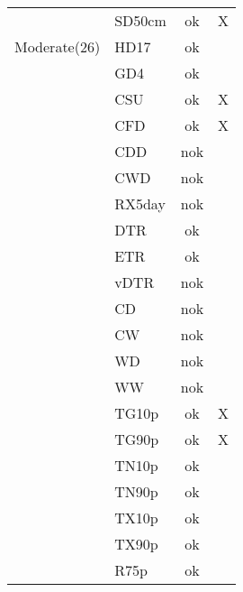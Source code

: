 \documentclass[a4paper,11pt]{article}
\begin{document}
\begin{table}[h]
\begin{tabular}{l l c c}
                     &  SD50cm   &   ok             &          X            \\
        Moderate(26) &  HD17     &   ok             &                       \\
                     &  GD4      &   ok             &                       \\
                     &  CSU      &   ok             &          X            \\
                     &  CFD      &   ok             &          X            \\
                     &  CDD      &   nok            &                       \\
                     &  CWD      &   nok            &                       \\
                     &  RX5day   &   nok            &                       \\
                     &  DTR      &   ok             &                       \\
                     &  ETR      &   ok             &                       \\
                     &  vDTR     &   nok            &                       \\    
                     &  CD       &   nok            &                       \\
                     &  CW       &   nok            &                       \\
                     &  WD       &   nok            &                       \\
                     &  WW       &   nok            &                       \\
                     &  TG10p    &   ok             &          X            \\
                     &  TG90p    &   ok             &          X            \\
                     &  TN10p    &   ok             &                       \\
                     &  TN90p    &   ok             &                       \\
                     &  TX10p    &   ok             &                       \\
                     &  TX90p    &   ok             &                       \\
                     &  R75p     &   ok             &                       \\

\end{tabular}
\end{table}
\end{document}
